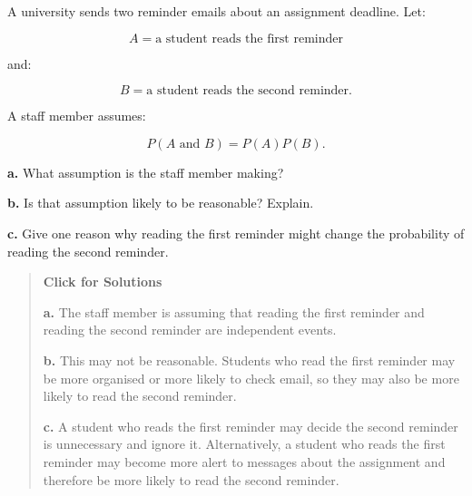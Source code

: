 \documentclass[
  letterpaper,
  DIV=11,
  numbers=noendperiod]{scrreprt}
\begin{document}
\begin{tcolorbox}[enhanced jigsaw, arc=.35mm, bottomrule=.15mm, bottomtitle=1mm, breakable, colback=white, colbacktitle=quarto-callout-note-color!10!white, colframe=quarto-callout-note-color-frame, coltitle=black, left=2mm, leftrule=.75mm, opacityback=0, opacitybacktitle=0.6, rightrule=.15mm, title=\textcolor{quarto-callout-note-color}{\faInfo}\hspace{0.5em}{Question 9}, titlerule=0mm, toprule=.15mm, toptitle=1mm]

A university sends two reminder emails about an assignment deadline.
Let:

\[A = \text{a student reads the first reminder}\]

and:

\[B = \text{a student reads the second reminder}.\]

A staff member assumes:

\[P(A \text{ and } B) = P(A)P(B).\]

\textbf{a.} What assumption is the staff member making?

\textbf{b.} Is that assumption likely to be reasonable? Explain.

\textbf{c.} Give one reason why reading the first reminder might change
the probability of reading the second reminder.

\begin{quote}
\textbf{Click for Solutions}

\textbf{a.} The staff member is assuming that reading the first reminder
and reading the second reminder are independent events.

\textbf{b.} This may not be reasonable. Students who read the first
reminder may be more organised or more likely to check email, so they
may also be more likely to read the second reminder.

\textbf{c.} A student who reads the first reminder may decide the second
reminder is unnecessary and ignore it. Alternatively, a student who
reads the first reminder may become more alert to messages about the
assignment and therefore be more likely to read the second reminder.
\end{quote}

\end{tcolorbox}
\end{document}

